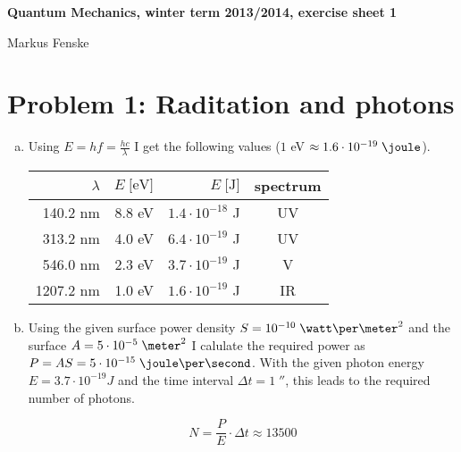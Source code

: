 \documentclass[a4paper,german,12pt,smallheadings]{scrartcl}
\begin{document}
\begin{center}
\bfseries %
\sffamily %
\vspace{-40pt}
Quantum Mechanics, winter term 2013/2014, exercise sheet 1

Markus Fenske
\vspace{-10pt}
\end{center}

\section*{Problem 1: Raditation and photons}

\begin{enumerate}[a)]

\item
  Using $E = hf = \frac{hc}{\lambda}$ I get the following values ($1$ eV $\approx 1.6\cdot10^{-19}\;\joule$).
  \vspace{7mm}

  \begin{tabular}{r | r | r | c}
    $\lambda$ & $E\;\text{[eV]}$ & $E\;\text{[J]}$ & spectrum \\
    \hline
    140.2 nm  & 8.8 eV & $1.4 \cdot 10^{-18}$ J & UV \\
    313.2 nm  & 4.0 eV & $6.4 \cdot 10^{-19}$ J & UV \\
    546.0 nm  & 2.3 eV & $3.7 \cdot 10^{-19}$ J & V \\
    1207.2 nm  & 1.0 eV & $1.6 \cdot 10^{-19}$ J & IR \\
  \end{tabular}

\item 
  Using the given surface power density $S = 10^{-10}\;\watt\per\meter^2$
  and the surface $A = 5\cdot10^{-5}\;\meter^2$ I calulate the required power
  as $P = AS = 5 \cdot 10^{-15}\;\joule\per\second$. With the given photon
  energy $E=3.7 \cdot 10^{-19} J$ and the time interval $\Delta t =
  1\;\second$, this leads to the required number of photons.

  \begin{equation*}
    N = \frac{P}{E} \cdot \Delta t \approx 13500
  \end{equation*}

\end{enumerate}
\end{document}
